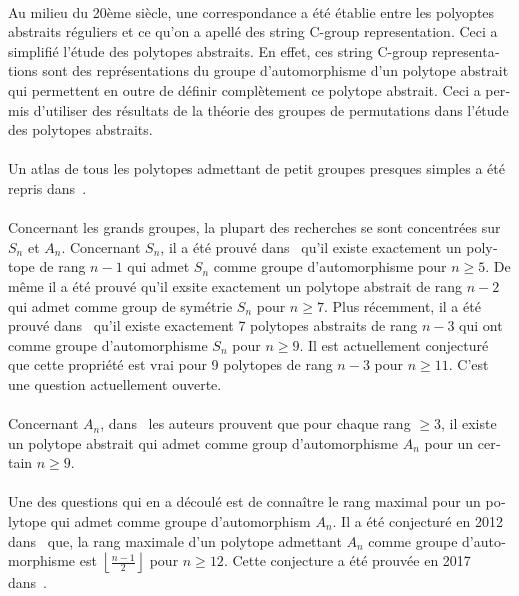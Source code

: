 \begin{otherlanguage}{french}
\paragraph{}
Au milieu du 20ème siècle, une correspondance a été établie entre les polyoptes abstraits réguliers et ce qu'on a apellé des string C-group representation. Ceci a simplifié l'étude des polytopes abstraits. En effet, ces string C-group representations sont des représentations du groupe d'automorphisme d'un polytope abstrait qui permettent en outre de définir complètement ce polytope abstrait. Ceci a permis d'utiliser des résultats de la théorie des groupes de permutations dans l'étude des polytopes abstraits.

\paragraph{}
Un atlas de tous les polytopes admettant de petit groupes presques simples a été repris dans~\cite{atlasPolytopes}.

\paragraph{}
Concernant les grands groupes, la plupart des recherches se sont concentrées sur $S_n$ et $A_n$. Concernant $S_n$, il a été prouvé dans~\cite{highRankSym} qu'il existe exactement un polytope de rang $n-1$ qui admet $S_n$ comme groupe d'automorphisme pour $n \ge 5$. De même il a été prouvé qu'il exsite exactement un polytope abstrait de rang $n-2$ qui admet comme group de symétrie $S_n$ pour $n \ge 7$. Plus récemment, il a été prouvé dans~\cite{leemansTransactions} qu'il existe exactement 7 polytopes abstraits de rang $n-3$ qui ont comme groupe d'automorphisme $S_n$ pour $n \ge 9$. Il est actuellement conjecturé que cette propriété est vrai pour 9 polytopes de rang $n-3$ pour $n \ge 11$. C'est une question actuellement ouverte.

\paragraph{}
Concernant $A_n$, dans~\cite{highRankAlternating} les auteurs prouvent que pour chaque rang $\ge 3$, il existe un polytope abstrait qui admet comme group d'automorphisme $A_n$ pour un certain $n \ge 9$.

\paragraph{}
Une des questions qui en a découlé est de connaître le rang maximal pour un polytope qui admet comme groupe d'automorphism $A_n$. Il a été conjecturé en 2012 dans~\cite{highRankAlternating} que, la rang maximale d'un polytope admettant $A_n$ comme groupe d'automorphisme est $\left\lfloor\frac{n-1}{2}\right\rfloor$ pour $n \ge 12$. Cette conjecture a été prouvée en 2017 dans~\cite{highestRankOfAn}.


\end{otherlanguage}
